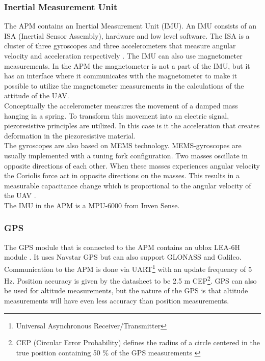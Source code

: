 \subsubsection{Inertial Measurement Unit}
The APM contains an Inertial Measurement Unit (IMU). An IMU consists of an ISA (Inertial Sensor Assembly), hardware and low level software. The ISA is a cluster of three gyroscopes and three accelerometers that measure angular velocity and acceleration respectively \citep{vik}. The IMU can also use magnetometer measurements. In the APM the magnetometer is not a part of the IMU, but it has an interface where it communicates with the magnetometer to make it possible to utilize the magnetometer measurements in the calculations of the attitude of the UAV.\\
\newline
Conceptually the accelerometer measures the movement of a damped mass hanging in a spring. To transform this movement into an electric signal, piezoresistive principles are utilized. In this case is it the acceleration that creates deformation in the piezoresistive material.\\
\newline
The gyroscopes are also based on MEMS technology. MEMS-gyroscopes are usually implemented with a tuning fork configuration. Two masses oscillate in opposite directions of each other. When these masses experiences angular velocity the Coriolis force act in opposite directions on the masses. This results in a measurable capacitance change which is proportional to the angular velocity of the UAV \citep{gyro}.\\
\newline
The IMU in the APM is a MPU-6000 from Inven Sense.
\subsubsection{GPS}
The GPS module that is connected to the APM contains an ublox LEA-6H module \citep{storeGPS}. It uses Navstar GPS but can also support GLONASS and Galileo. Communication to the APM is done via UART\footnote{Universal Asynchronous Receiver/Transmitter} with an update frequency of 5 Hz. Position accuracy is given by the datasheet to be 2.5 m CEP\footnote{CEP (Circular Error Probability) defines the radius of a circle centered in the true position containing 50 \% of the GPS measurements \citep{cep}}\citep{ublox}. GPS can also be used for altitude measurements, but the nature of the GPS is that altitude measurements will have even less accuracy than position measurements.
